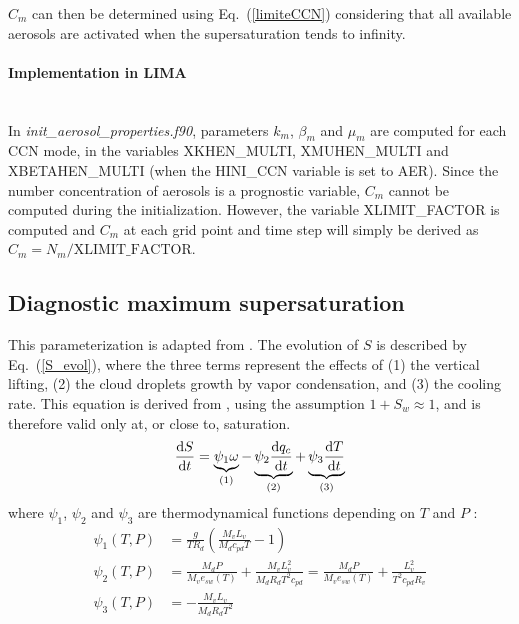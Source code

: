 $C_m$ can then be determined using Eq.\ (\ref{limiteCCN}) considering that all available aerosols are activated when the supersaturation tends to infinity.

\paragraph{Implementation in LIMA}
~\\
In \emph{init\_aerosol\_properties.f90}, parameters $k_m$, $\beta_m$ and $\mu_m$ are computed for each CCN mode, in the variables XKHEN\_MULTI, XMUHEN\_MULTI and XBETAHEN\_MULTI (when the HINI\_CCN variable is set to AER). Since the number concentration of aerosols is a prognostic variable, $C_m$ cannot be computed during the initialization. However, the variable XLIMIT\_FACTOR is computed and $C_m$ at each grid point and time step will simply be derived as $C_m=N_m/\mathrm{XLIMIT\_FACTOR}$.

\subsection{Diagnostic maximum supersaturation}

This parameterization is adapted from \citet{Cohard1998}. The evolution of $S$ is described by Eq.~(\ref{S_evol}), where the three terms represent the effects of (1) the vertical lifting, (2) the cloud droplets growth by vapor condensation, and (3) the cooling rate. This equation is derived from \citet[][their Eqs.\ (13)-(29)]{Pruppacher1997}, using the assumption $1+S_w \approx 1$, and is therefore valid only at, or close to, saturation.
\begin{equation}
  \label{S_evol}
  \frac{\textnormal{d} S}{\textnormal{d} t} = \underbrace{\psi_1 \omega}_{(1)} - \underbrace{\psi_2 \frac{\textnormal{d} q_c}{\textnormal{d} t}}_{(2)}+\underbrace{\psi_3 \frac{\textnormal{d} T}{\textnormal{d} t}}_{(3)}
\end{equation}
where $\psi_1$, $\psi_2$ and $\psi_3$ are thermodynamical functions depending on $T$ and $P$ \citep{Cohard1998}:
\begin{align}
 \psi_1(T,P) &= \frac{g}{TR_d} \left( \frac{M_vL_v}{M_dc_{pd}T}-1 \right) \\
 \psi_2(T,P) &= \frac{M_dP}{M_v e_{sw}(T)} + \frac{M_v L_v^2}{M_d R_d T^2 c_{pd}} = \frac{M_dP}{M_v e_{sw}(T)} + \frac{L_v^2}{T^2 c_{pd} R_v} \\
 \psi_3(T,P) &= - \frac{M_v L_v}{M_d R_d T^2}
\end{align}

